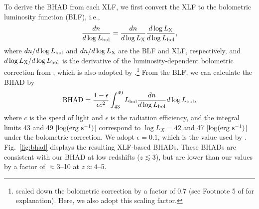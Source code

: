 \documentclass[twocolumn,twocolappendix,times]{aastex63}
\newcommand{\lx}{L_{\rm X}}
\newcommand{\lbol}{L_{\rm bol}}
\newcommand{\fst}[1]{#1}
\begin{document}
\begin{CJK*}{UTF8}{gbsn}
\fst{To derive the BHAD from each XLF, we first convert the XLF to the bolometric luminosity function (BLF), i.e., 
\begin{equation}
\label{eq:blf}
\frac{d n}{d \log \lbol} = 
    \frac{d n}{d \log \lx} \frac{d \log \lx}{d \log \lbol},
\end{equation}
where $d n/d \log \lbol$ and $d n/d \log \lx$ are the BLF and XLF, respectively, and $d \log \lx/d \log \lbol$ is the derivative of the luminosity-dependent bolometric correction from \cite{hopkins07}, which is also adopted by \cite{yang19}.\footnote{\fst{\cite{yang19} scaled down the \cite{hopkins07} bolometric correction by a factor of 0.7 (see Footnote 5 of \cite{yang19} for explanation). Here, we also adopt this scaling factor.}} 
From the BLF, we can calculate the BHAD by
\begin{equation}
\label{eq:blf_bhad}
{\rm BHAD} = \frac{1-\epsilon}{\epsilon c^2} 
\int_{43}^{49} \lbol \frac{dn}{d\log \lbol} d\log\lbol,
\end{equation}
where $c$ is the speed of light and $\epsilon$ is the radiation efficiency, and the integral limits 43 and 49 [$\log(\rm erg\ s^{-1})$] correspond to $\log L_X= 42$ and 47 [$\log(\rm erg\ s^{-1})$] under the \cite{hopkins07} bolometric correction.
We adopt $\epsilon=0.1$, which is the value used by \cite{yang19}.
Fig.~\ref{fig:bhad} displays the resulting XLF-based BHADs.
These BHADs are consistent with our BHAD at low redshifts ($z\lesssim 3$), but are lower than our values by a factor of $\approx 3$--10 at $z\approx 4$--5.
}


\end{CJK*}
\end{document}

